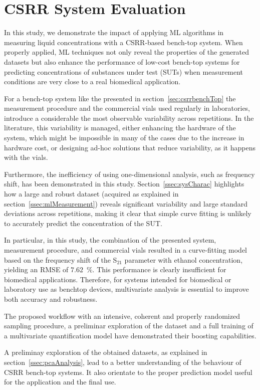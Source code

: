 \documentclass[journal,twoside,web]{ieeecolor}
\begin{document}
\section{CSRR System Evaluation}
\label{sec:csrrEval}

In this study, we demonstrate the impact of applying ML algorithms in measuring liquid concentrations with a CSRR-based bench-top system. When properly applied, ML techniques not only reveal the properties of the generated datasets but also enhance the performance of low-cost bench-top systems for predicting concentrations of substances under test (SUTs) when measurement conditions are very close to a real biomedical application.

For a bench-top system like the presented in section~\ref{sec:csrrbenchTop} the measurement procedure and the commercial vials used regularly in laboratories, introduce a considerable the most observable variability across repetitions. In the literature, this variability is managed, either enhancing the hardware of the system, which might be impossible in many of the cases due to the increase in hardware cost, or designing ad-hoc solutions that reduce variability, as it happens with the vials.

Furthermore, the inefficiency of using one-dimensional analysis, such as frequency shift, has been demonstrated in this study. Section~\ref{ssec:sysCharac} highlights how a large and robust dataset (acquired as explained in section~\ref{ssec:mlMeasurement}) reveals significant variability and large standard deviations across repetitions, making it clear that simple curve fitting is unlikely to accurately predict the concentration of the SUT. 

In particular, in this study, the combination of the presented system, measurement procedure, and commercial vials resulted in a curve-fitting model based on the frequency shift of the S$_{21}$ parameter with ethanol concentration, yielding an RMSE of $7.62$~$\%$. This performance is clearly insufficient for biomedical applications. Therefore, for systems intended for biomedical or laboratory use as benchtop devices, multivariate analysis is essential to improve both accuracy and robustness.

The proposed workflow with an intensive, coherent and properly randomized sampling procedure, a preliminar exploration of the dataset and a full training of a multivariate quantification model have demonstrated their boosting capabilities.

A preliminay exploration of the obtained datasets, as explained in section~\ref{ssec:pcaAnalysis}, lead to a better understanding of the behaviour of CSRR bench-top systems. It also orientate to the proper prediction model useful for the application and the final use.
\end{document}
